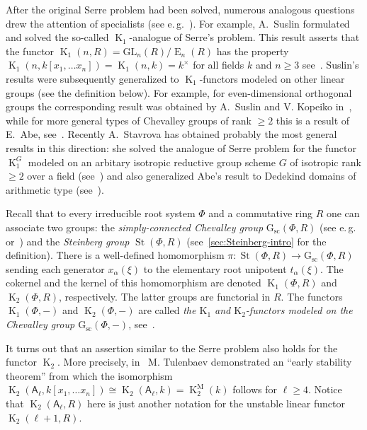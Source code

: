 \documentclass[10pt,a4paper,twoside]{article}
\theoremstyle{remark}
\theoremstyle{definition}
\numberwithin{lemma}{section}
\numberwithin{prop}{section}
\numberwithin{corollary}{section}
\numberwithin{externaltheorem}{section}
\DeclareMathOperator{\St}{St}
\DeclareMathOperator{\E}{E}
\DeclareMathOperator{\K}{K}
\newcommand{\GG}{\mathrm{G}_{\mathrm{sc}}}
\newcommand{\rA}{\mathsf{A}}
\numberwithin{equation}{section}
\begin{document}
After the original Serre problem had been solved, numerous analogous questions drew the attention of specialists (see e.\,g.~\cite{Su77, Su82, Abe83, Tu83, Lam10, St-poly, St-Ded}). For example, A.~Suslin formulated and solved the so-called $\K_1$-analogue of Serre's problem. This result asserts that the functor $\K_1(n, R) = \mathrm{GL}_{n}(R)/\E_n(R)$ has the property $\K_1(n, k[x_1, \ldots x_n]) = \K_1(n, k) = k^\times$ for all fields $k$ and $n \geq 3$ see~\cite[Corollary~7.11]{Su77}. Suslin's results were subsequently generalized to $\K_1$-functors modeled on other linear groups (see the definition below). For example, for even-dimensional orthogonal groups the corresponding result was obtained by A.~Suslin and V. Kopeiko in~\cite{Su82}, while for more general types of Chevalley groups of rank $\geq 2$ this is a result of E.~Abe, see~\cite{Abe83}. Recently A.~Stavrova has obtained probably the most general results in this direction: she solved the analogue of Serre problem for the functor $\K_1^G$ modeled on an arbitary isotropic reductive group scheme $G$ of isotropic rank $\geq 2$ over a field (see~\cite[Theorem~1.2]{St-poly}) and also generalized Abe's result to Dedekind domains of arithmetic type (see~\cite[Corollary~1.2]{St-Ded}).

Recall that to every irreducible root system $\Phi$ and a commutative ring $R$ one can associate two groups: the {\it simply-connected Chevalley group} $\GG(\Phi, R)$ (see e.\,g.~\cite[\S~3]{St71} or~\cite{VP}) and the {\it Steinberg group} $\St(\Phi, R)$ (see~\cref{sec:Steinberg-intro} for the definition). There is a well-defined homomorphism $\pi \colon \St(\Phi, R) \to \GG(\Phi, R)$ sending each generator $x_\alpha(\xi)$ to the elementary root unipotent $t_\alpha(\xi)$. The cokernel and the kernel of this homomorphism are denoted $\K_1(\Phi, R)$ and $\K_2(\Phi, R)$, respectively. The latter groups are functorial in $R$. The functors $\K_1(\Phi, -)$ and $\K_2(\Phi, -)$ are called {\it the $\mathrm{K}_1$ and $\mathrm{K_2}$-functors modeled on the Chevalley group $\GG(\Phi, -)$}, see~\cite{St78}.

It turns out that an assertion similar to the Serre problem also holds for the functor $\K_2$. More precisely, in~\cite{Tu83} M. Tulenbaev demonstrated an ``early stability theorem'' from which the isomorphism $\K_2(\rA_\ell, k[x_1, \ldots x_n]) \cong \K_2(\rA_\ell, k) = \K^\mathrm{M}_2(k)$ follows for $\ell \geq 4$. Notice that $\K_2(\rA_\ell, R)$ here is just another notation for the unstable linear functor $\K_2(\ell+1, R)$.
\end{document}

